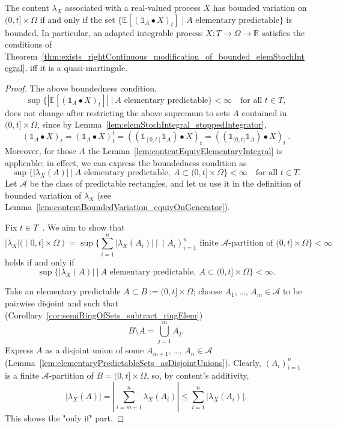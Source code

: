 \begin{lemma}\label{lem:realContentBoundedVariation_equivalent_definition}
  The content $\lambda_X$ associated with a real-valued process $X$
  has bounded variation on $(0, t] \times \Omega$ if and only if the set
  $\{\mathbb{E}[(\mathbb{1}_A \bullet X)_t] \mid A \text{ elementary predictable}\}$
  is bounded.
  In particular, an adapted integrable process $X : T \to \Omega \to \mathbb{R}$
  satisfies the conditions
  of Theorem~\ref{thm:exists_rightContinuous_modification_of_bounded_elemStochIntegral},
  iff it is a quasi-martingale.
\end{lemma}

\begin{proof}
  The above boundedness condition,
\[
\sup
  \Big\{
    |\mathbb{E}[(\mathbb{1}_A \bullet X)_t]|
    \:\Big|\:
    A \text{ elementary predictable}
  \Big\}
  <\infty
  \quad\text{for all } t\in T,
\]
  does not change after restricting the above supremum to sets
  $A$
  contained in $(0, t] \times \Omega$,
  since by
  Lemma~\ref{lem:elemStochIntegral_stoppedIntegrator},
\[
  (\mathbb{1}_A \bullet X)_t
  =
  (\mathbb{1}_A \bullet X)^t_t
  =
  ((\mathbb{1}_{[0, t]}\mathbb{1}_A) \bullet X)_t
  =
  ((\mathbb{1}_{(0, t]}\mathbb{1}_A) \bullet X)_t
  \:.
\]
  Moreover, for those $A$ the Lemma~\ref{lem:contentEquivElementaryIntegral} is applicable;
  in effect, we can express the boundedness condition as
\[
\sup
  \Big\{
    |\lambda_X(A)|
    \:\Big|\:
    A \text{ elementary predictable},\:
    A\subset(0,t]\times\Omega
  \Big\}
  <\infty
  \quad\text{for all } t\in T.
\]
  Let $\mathcal{A}$ be the class of predictable rectangles,
  and let us use it in the definition of bounded variation of $\lambda_X$
  (see Lemma~\ref{lem:contentBoundedVariation_equivOnGenerator}).

  Fix $t\in T$~. We aim to show that
\[
  \vert \lambda_X \vert((0,t]\times\Omega)
  = \sup\Big\{ \sum_{i=1}^n | \lambda_X(A_i)|
  \:\Big|\:
    (A_i)_{i=1}^n \text{ finite } \mathcal{A}\text{-partition of } (0,t]\times\Omega \Big\}
    <\infty
\]
  holds
  if and only if
\[
\sup
  \Big\{
    |\lambda_X(A)|
    \:\Big|\:
    A \text{ elementary predictable},\:
    A\subset(0,t]\times\Omega
  \Big\}
  <\infty.
\]

Take an elementary predictable $A\subset B:=(0,t]\times\Omega$;
choose $A_1$, \ldots, $A_m\in\mathcal{A}$ to be pairwise disjoint
and such that (Corollary~\ref{cor:semiRingOfSets_subtract_ringElem})
\[
    B\setminus A = \bigcup_{j=1}^m A_j.
\]
Express $A$ as a disjoint union of some $A_{m+1}$, \ldots, $A_n\in\mathcal{A}$
(Lemma~\ref{lem:elementaryPredictableSets_asDisjointUnions}).
Clearly, $(A_i)_{i=1}^n$ is a finite $\mathcal{A}$-partition of $B=(0,t]\times\Omega$, so,
by content's additivity,
\[
|\lambda_X(A)|
=
\left|
  \sum_{i=m+1}^n \lambda_X(A_i)
\right|
\le
\sum_{i=1}^n |\lambda_X(A_i)|.
\]
This shows the "only if" part.


\end{proof}
